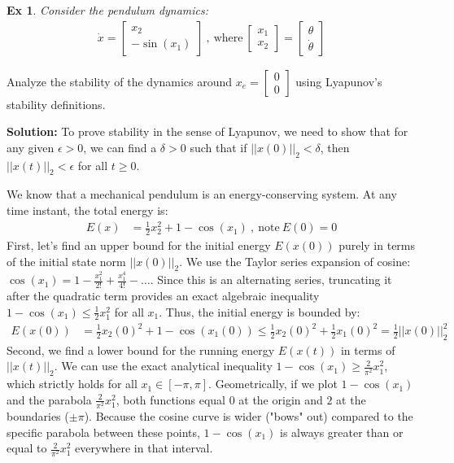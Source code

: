 \documentclass[twoside, 11pt]{article}
\newtheorem{exmp}[theorem]{Ex}
\begin{document}
\begin{exmp}
    Consider the pendulum dynamics:
    \begin{align*}
    \dot{x} = \begin{bmatrix} x_2 \\ -\sin(x_1)\end{bmatrix} \ , \ \mathrm{where} \ \begin{bmatrix} x_1 \\ x_2 \end{bmatrix} = \begin{bmatrix}  \theta \\ \dot{\theta} \end{bmatrix}
\end{align*}
\end{exmp}
Analyze the stability of the dynamics around $x_e = \begin{bmatrix} 0 \\ 0 \end{bmatrix}$ using Lyapunov's stability definitions.

\textbf{Solution:} To prove stability in the sense of Lyapunov, we need to show that for any given $\epsilon > 0$, we can find a $\delta > 0$ such that if $|| x(0) ||_2 < \delta$, then $|| x(t) ||_2 < \epsilon$ for all $t \geq 0$.

We know that a mechanical pendulum is an energy-conserving system. At any time instant, the total energy is: 
%
\begin{align*}
E(x) &= \frac{1}{2} x_2^2 + 1 - \cos(x_1) \ , \ \mathrm{note} \ E(0) = 0
\end{align*}
%
First, let's find an upper bound for the initial energy $E(x(0))$ purely in terms of the initial state norm $||x(0)||_2$. We use the Taylor series expansion of cosine: $\cos(x_1) = 1 - \frac{x_1^2}{2!} + \frac{x_1^4}{4!} - \dots$. Since this is an alternating series, truncating it after the quadratic term provides an exact algebraic inequality $1 - \cos(x_1) \leq \frac{1}{2} x_1^2$ for all $x_1$. Thus, the initial energy is bounded by:
%
\begin{align*}
E(x(0)) &= \frac{1}{2} x_2(0)^2 + 1 - \cos(x_1(0)) \leq \frac{1}{2} x_2(0)^2 + \frac{1}{2} x_1(0)^2 = \frac{1}{2} || x(0) ||_2^2 
\end{align*}
%
Second, we find a lower bound for the running energy $E(x(t))$ in terms of $||x(t)||_2$. We can use the exact analytical inequality $1 - \cos(x_1) \geq \frac{2}{\pi^2} x_1^2$, which strictly holds for all $x_1 \in [-\pi, \pi]$. Geometrically, if we plot $1 - \cos(x_1)$ and the parabola $\frac{2}{\pi^2} x_1^2$, both functions equal $0$ at the origin and $2$ at the boundaries ($\pm \pi$). Because the cosine curve is wider ("bows" out) compared to the specific parabola between these points, $1 - \cos(x_1)$ is always greater than or equal to $\frac{2}{\pi^2} x_1^2$ everywhere in that interval. 
\end{document}
